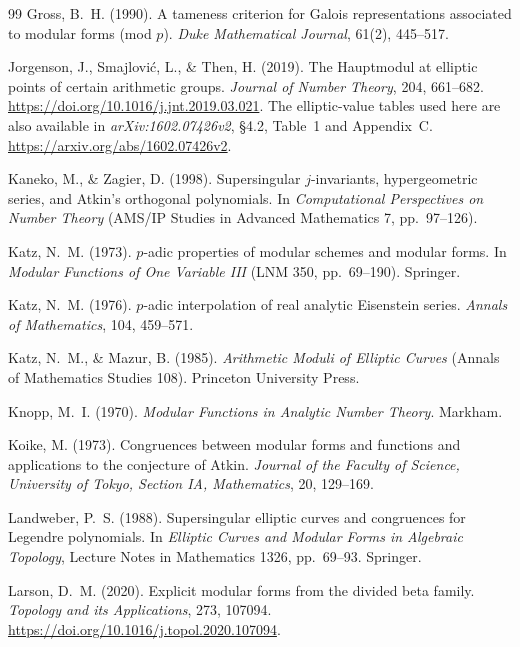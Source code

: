 \documentclass[11pt,a4paper]{article}
\numberwithin{equation}{section}
\theoremstyle{definition}
\theoremstyle{remark}
\begin{document}
\begin{thebibliography}{99}
 Gross, B.~H. (1990). A tameness criterion for Galois representations associated to modular forms (mod $p$). \emph{Duke Mathematical Journal}, 61(2), 445--517.

 Jorgenson, J., Smajlovi\'c, L., \& Then, H. (2019).
The Hauptmodul at elliptic points of certain arithmetic groups.
\emph{Journal of Number Theory}, 204, 661--682.
\url{https://doi.org/10.1016/j.jnt.2019.03.021}.
The elliptic-value tables used here are also available in
\emph{arXiv:1602.07426v2}, \S4.2, Table~1 and Appendix~C.
\url{https://arxiv.org/abs/1602.07426v2}.

 Kaneko, M., \& Zagier, D. (1998). Supersingular $j$-invariants,
hypergeometric series, and Atkin's orthogonal polynomials. In \emph{Computational Perspectives on Number
Theory} (AMS/IP Studies in Advanced Mathematics 7, pp.~97--126).

 Katz, N.~M. (1973). $p$-adic properties of modular schemes and modular forms.
In \emph{Modular Functions of One Variable III} (LNM 350, pp.~69--190). Springer.

 Katz, N.~M. (1976). $p$-adic interpolation of real analytic Eisenstein series. \emph{Annals of Mathematics}, 104, 459--571.

 Katz, N.~M., \& Mazur, B. (1985). \emph{Arithmetic Moduli of Elliptic
Curves} (Annals of Mathematics Studies 108). Princeton University Press.

 Knopp, M.~I. (1970). \emph{Modular Functions in Analytic Number Theory}. Markham.

 Koike, M. (1973). Congruences between modular forms
and functions and applications to the conjecture of Atkin.
\emph{Journal of the Faculty of Science, University of Tokyo, Section IA, Mathematics},
20, 129--169.

 Landweber, P.~S. (1988). Supersingular elliptic curves and congruences for Legendre polynomials. In \emph{Elliptic Curves and Modular Forms in Algebraic Topology}, Lecture Notes in Mathematics 1326, pp.~69--93. Springer.

 Larson, D.~M. (2020). Explicit modular forms from the divided beta family. \emph{Topology and its Applications}, 273, 107094. \url{https://doi.org/10.1016/j.topol.2020.107094}.


\end{thebibliography}
\end{document}
